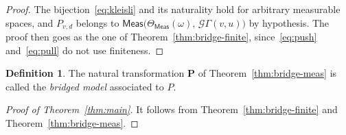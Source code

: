 \documentclass[11pt,a4paper]{article}
\theoremstyle{plain}
\theoremstyle{definition}
\newtheorem{definition}[theorem]{Definition}
\theoremstyle{remark}
\newcommand{\cat}[1]{\mathsf{#1}}
\newcommand{\Meas}{\cat{Meas}}
\newcommand{\G}{\mathcal{G}}
\begin{document}
\begin{proof}
The bijection~\eqref{eq:kleisli} and its naturality hold for arbitrary
measurable spaces, and $P_{v,d}$ belongs to
$\Meas\bigl(\Theta_\Meas(\omega),\,\G\Gamma(v,u)\bigr)$ by hypothesis. The
proof then goes as the one of Theorem~\ref{thm:bridge-finite},
since~\eqref{eq:push} and~\eqref{eq:pull} do not use finiteness.
\end{proof}

\begin{definition}\label{def:bridged}
The natural transformation $\mathbf{P}$ of Theorem~\ref{thm:bridge-meas} is
called the \emph{bridged model} associated to $P$.
\end{definition}

\begin{proof}[Proof of Theorem~\ref{thm:main}]
It follows from Theorem~\ref{thm:bridge-finite} and
Theorem~\ref{thm:bridge-meas}.
\end{proof}
\end{document}
